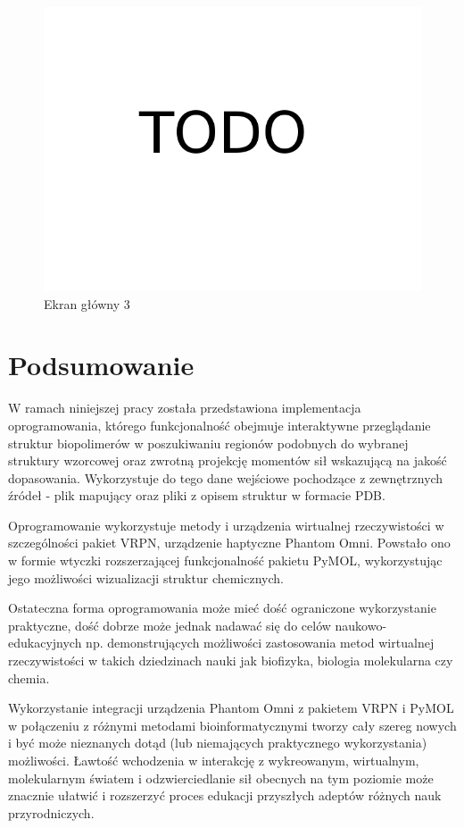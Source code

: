 \documentclass[licencjacka]{pracamgr}
\begin{document}
\begin{figure}[H]
\centering
\includegraphics[scale=0.3,center]{todo}
\caption{Ekran główny 3}
\end{figure}

\chapter{Podsumowanie}
W ramach niniejszej pracy została przedstawiona implementacja oprogramowania, którego funkcjonalność obejmuje interaktywne przeglądanie struktur biopolimerów w poszukiwaniu regionów podobnych do wybranej struktury wzorcowej oraz zwrotną projekcję momentów sił wskazującą na jakość dopasowania. Wykorzystuje do tego dane wejściowe pochodzące z zewnętrznych źródeł - plik mapujący oraz pliki z opisem struktur w formacie PDB.

Oprogramowanie wykorzystuje metody i urządzenia wirtualnej rzeczywistości w szczególności pakiet VRPN, urządzenie haptyczne Phantom Omni. Powstało ono w formie wtyczki rozszerzającej funkcjonalność pakietu PyMOL, wykorzystując jego możliwości wizualizacji struktur chemicznych.

Ostateczna forma oprogramowania może mieć dość ograniczone wykorzystanie praktyczne, dość dobrze może jednak nadawać się do celów naukowo-edukacyjnych np. demonstrujących możliwości zastosowania metod wirtualnej rzeczywistości w takich dziedzinach nauki jak biofizyka, biologia molekularna czy chemia.

Wykorzystanie integracji urządzenia Phantom Omni z pakietem VRPN i PyMOL w połączeniu z różnymi metodami bioinformatycznymi tworzy cały szereg nowych i być może nieznanych dotąd (lub niemających praktycznego wykorzystania) możliwości. Ławtość wchodzenia w interakcję z wykreowanym, wirtualnym, molekularnym światem i odzwierciedlanie sił obecnych na tym poziomie może znacznie ułatwić i rozszerzyć proces edukacji przyszłych adeptów różnych nauk przyrodniczych.
\end{document}
